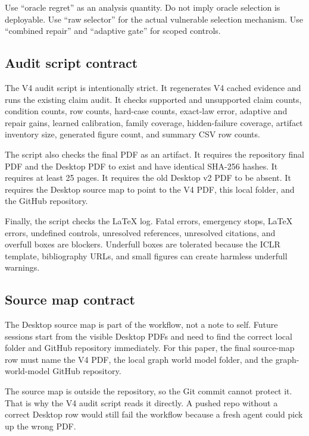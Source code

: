 \documentclass{article}
\begin{document}
Use ``oracle regret'' as an analysis quantity.  Do not imply oracle selection is
deployable.  Use ``raw selector'' for the actual vulnerable selection mechanism.
Use ``combined repair'' and ``adaptive gate'' for scoped controls.

\subsection{Audit script contract}

The V4 audit script is intentionally strict.  It regenerates V4 cached evidence
and runs the existing claim audit.  It checks supported and unsupported claim
counts, condition counts, row counts, hard-case counts, exact-law error,
adaptive and repair gains, learned calibration, family coverage, hidden-failure
coverage, artifact inventory size, generated figure count, and summary CSV row
counts.

The script also checks the final PDF as an artifact.  It requires the repository
final PDF and the Desktop PDF to exist and have identical SHA-256 hashes.  It
requires at least 25 pages.  It requires the old Desktop v2 PDF to be absent.  It
requires the Desktop source map to point to the V4 PDF, this local folder, and
the GitHub repository.

Finally, the script checks the LaTeX log.  Fatal errors, emergency stops,
LaTeX errors, undefined controls, unresolved references, unresolved citations,
and overfull boxes are blockers.  Underfull boxes are tolerated because the ICLR
template, bibliography URLs, and small figures can create harmless underfull
warnings.

\subsection{Source map contract}

The Desktop source map is part of the workflow, not a note to self.  Future
sessions start from the visible Desktop PDFs and need to find the correct local
folder and GitHub repository immediately.  For this paper, the final source-map
row must name the V4 PDF, the local graph world model folder, and the
graph-world-model GitHub repository.

The source map is outside the repository, so the Git commit cannot protect it.
That is why the V4 audit script reads it directly.  A pushed repo without a
correct Desktop row would still fail the workflow because a fresh agent could
pick up the wrong PDF.
\end{document}
